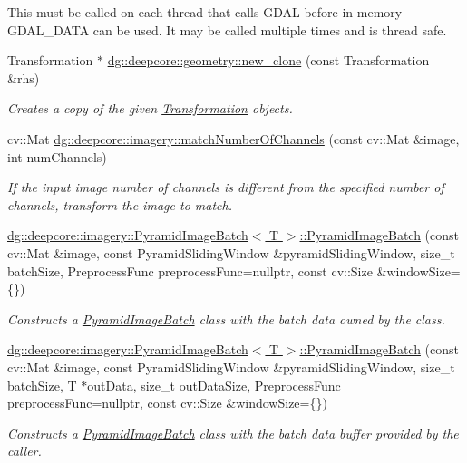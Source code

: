 \begin{DoxyCompactItemize}
\begin{DoxyCompactList}
This must be called on each thread that calls G\+D\+AL before in-\/memory G\+D\+A\+L\+\_\+\+D\+A\+TA can be used. It may be called multiple times and is thread safe. \end{DoxyCompactList}\item 
Transformation $\ast$ \hyperlink{group___imagery_module_ga27ac0f7aa9d16ebbc534d0a07ed2ea09}{dg\+::deepcore\+::geometry\+::new\+\_\+clone} (const Transformation \&rhs)
\begin{DoxyCompactList}\small\item\em Creates a copy of the given \hyperlink{structdg_1_1deepcore_1_1geometry_1_1_transformation}{Transformation} objects. \end{DoxyCompactList}\item 
cv\+::\+Mat \hyperlink{group___imagery_module_ga95eb6f615115ac89f33bed1f11861a13}{dg\+::deepcore\+::imagery\+::match\+Number\+Of\+Channels} (const cv\+::\+Mat \&image, int num\+Channels)
\begin{DoxyCompactList}\small\item\em If the input image number of channels is different from the specified number of channels, transform the image to match. \end{DoxyCompactList}\item 
\hyperlink{group___imagery_module_ga5779bf3b610df23758e3f905b03f67ef}{dg\+::deepcore\+::imagery\+::\+Pyramid\+Image\+Batch$<$ T $>$\+::\+Pyramid\+Image\+Batch} (const cv\+::\+Mat \&image, const Pyramid\+Sliding\+Window \&pyramid\+Sliding\+Window, size\+\_\+t batch\+Size, Preprocess\+Func preprocess\+Func=nullptr, const cv\+::\+Size \&window\+Size=\{\})
\begin{DoxyCompactList}\small\item\em Constructs a \hyperlink{classdg_1_1deepcore_1_1imagery_1_1_pyramid_image_batch}{Pyramid\+Image\+Batch} class with the batch data owned by the class. \end{DoxyCompactList}\item 
\hyperlink{group___imagery_module_gab801036420ec3dd50de9d5c5e3ec4024}{dg\+::deepcore\+::imagery\+::\+Pyramid\+Image\+Batch$<$ T $>$\+::\+Pyramid\+Image\+Batch} (const cv\+::\+Mat \&image, const Pyramid\+Sliding\+Window \&pyramid\+Sliding\+Window, size\+\_\+t batch\+Size, T $\ast$out\+Data, size\+\_\+t out\+Data\+Size, Preprocess\+Func preprocess\+Func=nullptr, const cv\+::\+Size \&window\+Size=\{\})
\begin{DoxyCompactList}\small\item\em Constructs a \hyperlink{classdg_1_1deepcore_1_1imagery_1_1_pyramid_image_batch}{Pyramid\+Image\+Batch} class with the batch data buffer provided by the caller. \end{DoxyCompactList}\item 

\end{DoxyCompactItemize}
